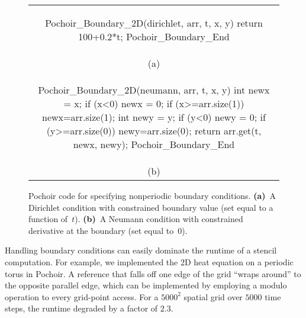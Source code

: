 \begin{figure}
\begin{center}
\begin{tabular}{c}
\begin{minipage}[t]{3.2in}
\lstset{language=Pochoir_bf}
\begin{pochoir-listing}
Pochoir_Boundary_2D(dirichlet, arr, t, x, y)
    return 100+0.2*t;
Pochoir_Boundary_End
\end{pochoir-listing}
\end{minipage}
\\
\textrm{\small (a)} %
\\
\begin{minipage}[t]{3.2in}
\lstset{language=Pochoir_bf}
\begin{pochoir-listing}
Pochoir_Boundary_2D(neumann, arr, t, x, y)
    int newx = x;
    if (x<0) newx = 0;
    if (x>=arr.size(1)) newx=arr.size(1);
    int newy = y;
    if (y<0) newy = 0;
    if (y>=arr.size(0)) newy=arr.size(0);
    return arr.get(t, newx, newy);
Pochoir_Boundary_End
\end{pochoir-listing}
\end{minipage}
\\
\textrm{\small (b)} %
\\
\end{tabular}
\end{center}
\caption{Pochoir code for specifying nonperiodic boundary conditions.
  \textbf{(a)}~A Dirichlet condition with constrained boundary value
  (set equal to a function of~$t$). \textbf{(b)}~A Neumann condition
  with constrained derivative at the boundary (set equal to~$0$).}
\label{fig:boundary}
\end{figure}


Handling boundary conditions can easily dominate the runtime of a
stencil computation.  For example, we implemented %
  the $2$D heat equation on a periodic torus in Pochoir.  A
reference that falls off one edge of the grid ``wraps around'' to the
opposite parallel edge, which can be implemented by employing a modulo
operation to every grid-point access.  For a $5000^2$ spatial grid
over $5000$ time steps, the runtime degraded by a factor of $2.3$.

